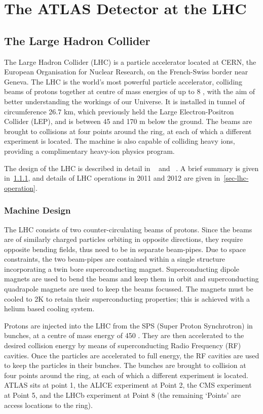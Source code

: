 \graphicspath{{Chapters/Detector/Figures/}}
\chapter{The ATLAS Detector at the LHC}
\label{chap:Detector}

\section{The Large Hadron Collider}

The Large Hadron Collider (LHC) is a particle accelerator located at CERN, the
European Organisation for Nuclear Research, on the French-Swiss border near
Geneva. The LHC is the world's most powerful particle accelerator, colliding beams of
protons together at centre of mass energies of up to 8 \TeV, with the aim of
better understanding the workings of our Universe. It is installed in
tunnel of circumference 26.7 km, which previously held the Large
Electron-Positron Collider (LEP), and is between 45 and 170 m below the ground.
The beams are brought to collisions at four points around the ring, at each of
which a different experiment is located. The machine is also capable of colliding heavy ions, providing a complimentary heavy-ion physics program.

The design of the LHC is described in detail in ~\cite{1748-0221-3-08-S08001}
and ~\cite{Brüning:782076}. A brief summary is given in~\ref{sec-lhc-design},
and details of LHC operations in 2011 and 2012 are given
in~\ref{sec-lhc-operation}.

\subsection{Machine Design}
\label{sec-lhc-design}

The LHC consists of two counter-circulating beams of protons. 
Since the beams are of similarly charged particles
orbiting in opposite directions, they require opposite bending fields, thus need
to be in separate beam-pipes. Due to space constraints, the two beam-pipes are
contained within a single structure incorporating a twin bore superconducting
magnet. Superconducting dipole magnets are
used to bend the beams and keep them in orbit and superconducting quadrapole magnets are used to
keep the beams focussed. The magnets must be cooled to 2K to retain their superconducting
properties; this is achieved with a helium based cooling system. 

Protons are injected into the LHC from the SPS (Super Proton Synchrotron) in
bunches, at a centre of mass energy of 450 \GeV. They are then accelerated to the desired
collision energy by means of superconducting Radio Frequency (RF) cavities. Once the
particles are accelerated to full energy, the RF cavities are used to keep the
particles in their bunches. The bunches are brought to collision at four points
around the ring, at each of which a different experiment is located. ATLAS sits at
point 1, the ALICE experiment at Point 2, the CMS experiment at Point 5, and the
LHCb experiment at Point 8 (the remaining `Points' are access locations to the
ring).

